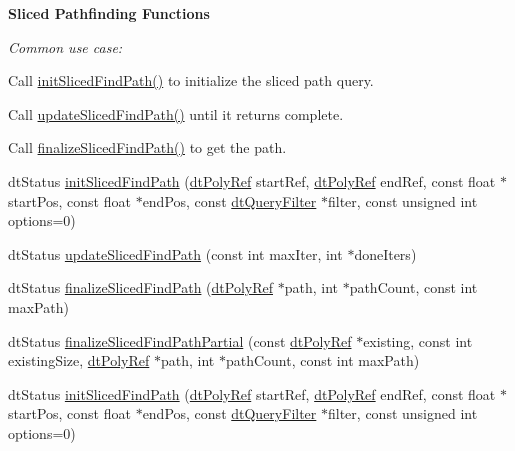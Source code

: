 \begin{Indent}\textbf{ Sliced Pathfinding Functions}\par
{\em Common use case\+:
\begin{DoxyEnumerate}
\item Call \hyperlink{classdtNavMeshQuery_ae9a478194f14f1a4591f8b6528007d82}{init\+Sliced\+Find\+Path()} to initialize the sliced path query.
\item Call \hyperlink{classdtNavMeshQuery_aa0c147e3da7fd0b59342da0fc456afc7}{update\+Sliced\+Find\+Path()} until it returns complete.
\item Call \hyperlink{classdtNavMeshQuery_a98673bb238fbb139ec8407e266fa76fd}{finalize\+Sliced\+Find\+Path()} to get the path. 
\end{DoxyEnumerate}}\begin{DoxyCompactItemize}
\item 
dt\+Status \hyperlink{classdtNavMeshQuery_ae9a478194f14f1a4591f8b6528007d82}{init\+Sliced\+Find\+Path} (\hyperlink{group__detour_gab4e0b2257a670c1a800057999612b466}{dt\+Poly\+Ref} start\+Ref, \hyperlink{group__detour_gab4e0b2257a670c1a800057999612b466}{dt\+Poly\+Ref} end\+Ref, const float $\ast$start\+Pos, const float $\ast$end\+Pos, const \hyperlink{classdtQueryFilter}{dt\+Query\+Filter} $\ast$filter, const unsigned int options=0)
\item 
dt\+Status \hyperlink{classdtNavMeshQuery_aa0c147e3da7fd0b59342da0fc456afc7}{update\+Sliced\+Find\+Path} (const int max\+Iter, int $\ast$done\+Iters)
\item 
dt\+Status \hyperlink{classdtNavMeshQuery_a98673bb238fbb139ec8407e266fa76fd}{finalize\+Sliced\+Find\+Path} (\hyperlink{group__detour_gab4e0b2257a670c1a800057999612b466}{dt\+Poly\+Ref} $\ast$path, int $\ast$path\+Count, const int max\+Path)
\item 
dt\+Status \hyperlink{classdtNavMeshQuery_a01b18dcb5d25fc392b6030ae5d4f310e}{finalize\+Sliced\+Find\+Path\+Partial} (const \hyperlink{group__detour_gab4e0b2257a670c1a800057999612b466}{dt\+Poly\+Ref} $\ast$existing, const int existing\+Size, \hyperlink{group__detour_gab4e0b2257a670c1a800057999612b466}{dt\+Poly\+Ref} $\ast$path, int $\ast$path\+Count, const int max\+Path)
\item 
dt\+Status \hyperlink{classdtNavMeshQuery_ae9a478194f14f1a4591f8b6528007d82}{init\+Sliced\+Find\+Path} (\hyperlink{group__detour_gab4e0b2257a670c1a800057999612b466}{dt\+Poly\+Ref} start\+Ref, \hyperlink{group__detour_gab4e0b2257a670c1a800057999612b466}{dt\+Poly\+Ref} end\+Ref, const float $\ast$start\+Pos, const float $\ast$end\+Pos, const \hyperlink{classdtQueryFilter}{dt\+Query\+Filter} $\ast$filter, const unsigned int options=0)

\end{DoxyCompactItemize}
\end{Indent}
